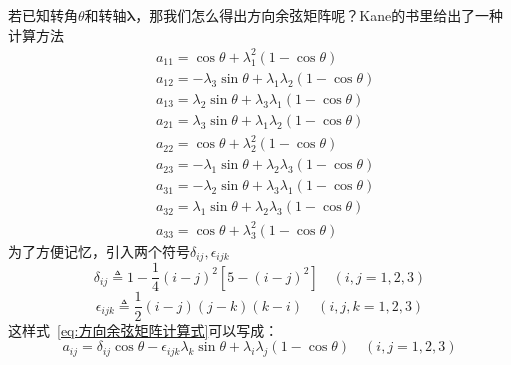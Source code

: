 若已知转角$\theta$和转轴$\mathbf{\lambda}$，那我们怎么得出方向余弦矩阵呢？Kane的书里给出了一种计算方法
\begin{equation}
    \label{eq:方向余弦矩阵计算式}
    \begin{aligned}&a_{11}=\cos\theta+\lambda_1^2(1-\cos\theta)\\&a_{12}=-\lambda_3\sin\theta+\lambda_1\lambda_2(1-\cos\theta)\\&a_{13}=\lambda_2\sin\theta+\lambda_3\lambda_1(1-\cos\theta)\\&a_{21}=\lambda_3\sin\theta+\lambda_1\lambda_2(1-\cos\theta)\\&a_{22}=\cos\theta+\lambda_2^2(1-\cos\theta)\\&a_{23}=-\lambda_1\sin\theta+\lambda_2\lambda_3(1-\cos\theta)\\&a_{31}=-\lambda_2\sin\theta+\lambda_3\lambda_1(1-\cos\theta)\\&a_{32}=\lambda_1\sin\theta+\lambda_2\lambda_3(1-\cos\theta)\\&a_{33}=\cos\theta+\lambda_3^2(1-\cos\theta)
\end{aligned}
\end{equation}
为了方便记忆，引入两个符号$\delta_{ij},\epsilon_{ijk}$
\begin{equation}
    \delta_{ij}\triangleq1-\frac{1}{4}(i-j)^2[5-(i-j)^2]\quad(i,j=1,2,3)
\end{equation}
\begin{equation}
    \epsilon_{ijk}\triangleq\frac{1}{2}(i-j)(j-k)(k-i)\quad(i,j,k=1,2,3)
\end{equation}
这样式~\eqref{eq:方向余弦矩阵计算式}可以写成：
\begin{equation}
    a_{ij}=\delta_{ij}\cos\theta-\epsilon_{ijk}\lambda_{k}\sin\theta+\lambda_{i}\lambda_{j}(1-\cos\theta)\quad(i,j=1,2,3)
\end{equation}

